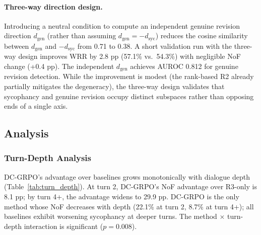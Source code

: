 \documentclass[11pt,a4paper]{article}
\newcommand{\dsyc}{d_{\text{syc}}}
\newcommand{\dgen}{d_{\text{gen}}}
\begin{document}
\paragraph{Three-way direction design.}
Introducing a neutral condition to compute an independent genuine revision direction $\dgen$ (rather than assuming $\dgen = -\dsyc$) reduces the cosine similarity between $\dgen$ and $-\dsyc$ from 0.71 to 0.38. A short validation run with the three-way design improves WRR by 2.8 pp (57.1\% vs.\ 54.3\%) with negligible NoF change (+0.4 pp). The independent $\dgen$ achieves AUROC 0.812 for genuine revision detection. While the improvement is modest (the rank-based R2 already partially mitigates the degeneracy), the three-way design validates that sycophancy and genuine revision occupy distinct subspaces rather than opposing ends of a single axis.

\subsection{Analysis}
\label{sec:analysis}

\subsubsection{Turn-Depth Analysis}

DC-GRPO's advantage over baselines grows monotonically with dialogue depth (Table~\ref{tab:turn_depth}). At turn 2, DC-GRPO's NoF advantage over R3-only is 8.1 pp; by turn 4+, the advantage widens to 29.9 pp. DC-GRPO is the only method whose NoF decreases with depth (22.1\% at turn 2, 8.7\% at turn 4+); all baselines exhibit worsening sycophancy at deeper turns. The method $\times$ turn-depth interaction is significant ($p = 0.008$).
\end{document}
